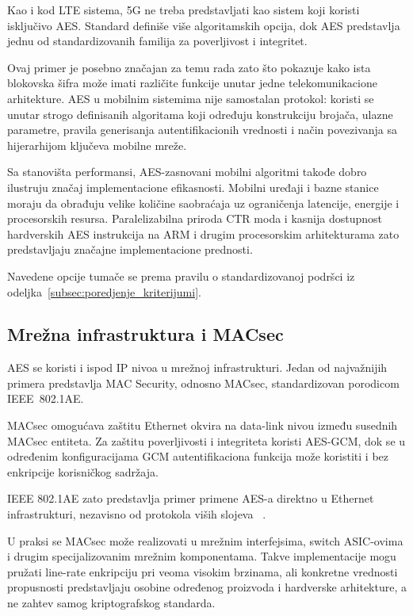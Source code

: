 Kao i kod LTE sistema, 5G ne treba predstavljati kao sistem koji
koristi isključivo AES. Standard definiše više algoritamskih opcija,
dok AES predstavlja jednu od standardizovanih familija za
poverljivost i integritet.

Ovaj primer je posebno značajan za temu rada zato što pokazuje kako
ista blokovska šifra može imati različite funkcije unutar jedne
telekomunikacione arhitekture. AES u mobilnim sistemima nije
samostalan protokol: koristi se unutar strogo definisanih algoritama
koji određuju konstrukciju brojača, ulazne parametre, pravila
generisanja autentifikacionih vrednosti i način povezivanja sa
hijerarhijom ključeva mobilne mreže.

Sa stanovišta performansi, AES-zasnovani mobilni algoritmi takođe
dobro ilustruju značaj implementacione efikasnosti. Mobilni uređaji i
bazne stanice moraju da obrađuju velike količine saobraćaja uz
ograničenja latencije, energije i procesorskih resursa. Paralelizabilna
priroda CTR moda i kasnija dostupnost hardverskih AES instrukcija na
ARM i drugim procesorskim arhitekturama zato predstavljaju značajne
implementacione prednosti.

Navedene opcije tumače se prema pravilu o standardizovanoj podršci iz
odeljka~\ref{subsec:poredjenje_kriterijumi}.

\subsection{Mrežna infrastruktura i MACsec}
\label{subsec:infrastruktura}

AES se koristi i ispod IP nivoa u mrežnoj infrastrukturi. Jedan od
najvažnijih primera predstavlja MAC Security, odnosno MACsec,
standardizovan porodicom IEEE~802.1AE.

MACsec omogućava zaštitu Ethernet okvira na data-link nivou između
susednih MACsec entiteta. Za zaštitu poverljivosti i integriteta koristi
AES-GCM, dok se u određenim konfiguracijama GCM autentifikaciona
funkcija može koristiti i bez enkripcije korisničkog sadržaja.

IEEE 802.1AE zato predstavlja primer primene AES-a direktno u
Ethernet infrastrukturi, nezavisno od protokola viših slojeva
~\cite{ieee8021ae}.

U praksi se MACsec može realizovati u mrežnim interfejsima, switch
ASIC-ovima i drugim specijalizovanim mrežnim komponentama. Takve
implementacije mogu pružati line-rate enkripciju pri veoma visokim
brzinama, ali konkretne vrednosti propusnosti predstavljaju osobine
određenog proizvoda i hardverske arhitekture, a ne zahtev samog
kriptografskog standarda.

